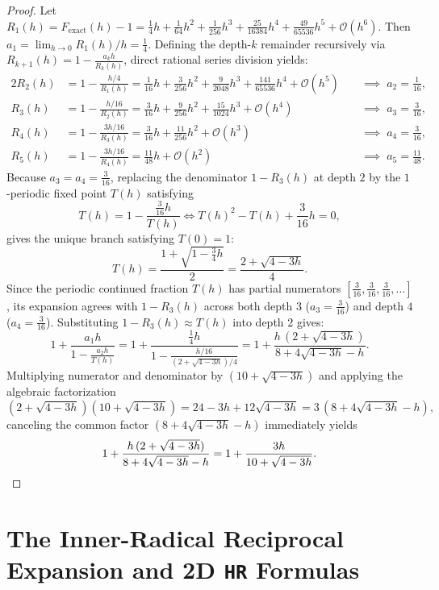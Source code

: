 \documentclass[11pt,a4paper]{article}
\theoremstyle{spacious}
\theoremstyle{spaciousdef}
\begin{document}
\begin{proof}
Let $R_1(h) = F_{\text{exact}}(h) - 1 = \tfrac{1}{4}h + \tfrac{1}{64}h^2 + \tfrac{1}{256}h^3 + \tfrac{25}{16384}h^4 + \tfrac{49}{65536}h^5 + \mathcal{O}(h^6)$. Then $a_1 = \lim_{h\to 0} R_1(h)/h = \tfrac{1}{4}$. Defining the depth-$k$ remainder recursively via $R_{k+1}(h) = 1 - \tfrac{a_k h}{R_k(h)}$, direct rational series division yields:
\begin{alignat*}{2}
R_2(h) &= 1 - \frac{h/4}{R_1(h)} = \frac{1}{16}h + \frac{3}{256}h^2 + \frac{9}{2048}h^3 + \frac{141}{65536}h^4 + \mathcal{O}(h^5) &&\;\implies\; a_2 = \frac{1}{16},\\
R_3(h) &= 1 - \frac{h/16}{R_2(h)} = \frac{3}{16}h + \frac{9}{256}h^2 + \frac{15}{1024}h^3 + \mathcal{O}(h^4) &&\;\implies\; a_3 = \frac{3}{16},\\
R_4(h) &= 1 - \frac{3h/16}{R_3(h)} = \frac{3}{16}h + \frac{11}{256}h^2 + \mathcal{O}(h^3) &&\;\implies\; a_4 = \frac{3}{16},\\
R_5(h) &= 1 - \frac{3h/16}{R_4(h)} = \frac{11}{48}h + \mathcal{O}(h^2) &&\;\implies\; a_5 = \frac{11}{48}.
\end{alignat*}
Because $a_3 = a_4 = \tfrac{3}{16}$, replacing the denominator $1 - R_3(h)$ at depth $2$ by the $1$-periodic fixed point $T(h)$ satisfying
\[
T(h) = 1 - \frac{\frac{3}{16}h}{T(h)} \iff T(h)^2 - T(h) + \frac{3}{16}h = 0,
\]
gives the unique branch satisfying $T(0) = 1$:
\[
T(h) = \frac{1 + \sqrt{1 - \frac{3}{4}h}}{2} = \frac{2 + \sqrt{4 - 3h}}{4}.
\]
Since the periodic continued fraction $T(h)$ has partial numerators $[\tfrac{3}{16}, \tfrac{3}{16}, \tfrac{3}{16}, \dots]$, its expansion agrees with $1 - R_3(h)$ across both depth $3$ ($a_3 = \tfrac{3}{16}$) and depth $4$ ($a_4 = \tfrac{3}{16}$). Substituting $1 - R_3(h) \approx T(h)$ into depth $2$ gives:
\[
1 + \frac{a_1 h}{1 - \frac{a_2 h}{T(h)}} = 1 + \frac{\frac{1}{4}h}{1 - \frac{h/16}{(2 + \sqrt{4 - 3h})/4}} = 1 + \frac{h\,(2 + \sqrt{4 - 3h})}{8 + 4\sqrt{4 - 3h} - h}.
\]
Multiplying numerator and denominator by $(10 + \sqrt{4 - 3h})$ and applying the algebraic factorization
\[
(2 + \sqrt{4 - 3h})(10 + \sqrt{4 - 3h}) = 24 - 3h + 12\sqrt{4 - 3h} = 3\,(8 + 4\sqrt{4 - 3h} - h),
\]
canceling the common factor $(8 + 4\sqrt{4 - 3h} - h)$ immediately yields
\[
1 + \frac{h\,(2 + \sqrt{4 - 3h})}{8 + 4\sqrt{4 - 3h} - h} = 1 + \frac{3h}{10 + \sqrt{4 - 3h}}. \qedhere
\]
\end{proof}

\section{The Inner-Radical Reciprocal Expansion and 2D \texttt{HR} Formulas}
\end{document}

